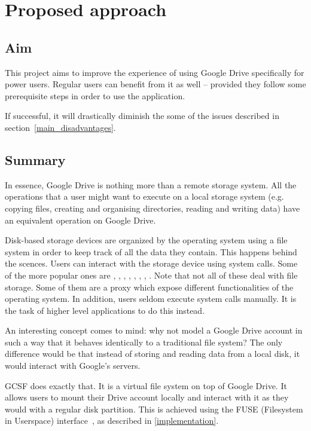 \chapter{Proposed approach}

\section{Aim}

This project aims to improve the experience of using Google Drive specifically for power users. Regular users can benefit from it as well -- provided they follow some prerequisite steps in order to use the application.

If successful, it will drastically diminish the some of the issues described in section~\ref{main_disadvantages}.

\section{Summary}

In essence, Google Drive is nothing more than a remote storage system. All the operations that a user might want to execute on a local storage system (e.g. copying files, creating and organising directories, reading and writing data) have an equivalent operation on Google Drive.

Disk-based storage devices are organized by the operating system using a file system in order to keep track of all the data they contain. This happens behind the scences. Users can interact with the storage device using system calls. Some of the more popular ones are , , , , , , , . Note that not all of these deal with file storage. Some of them are a proxy which expose different functionalities of the operating system. In addition, users seldom execute system calls manually. It is the task of higher level applications to do this instead.

An interesting concept comes to mind: why not model a Google Drive account in such a way that it behaves identically to a traditional file system? The only difference would be that instead of storing and reading data from a local disk, it would interact with Google's servers.

GCSF does exactly that. It is a virtual file system on top of Google Drive. It allows users to mount their Drive account locally and interact with it as they would with a regular disk partition. This is achieved using the FUSE (Filesystem in Userspace) interface~\cite{libfuse}, as described in \ref{implementation}.

